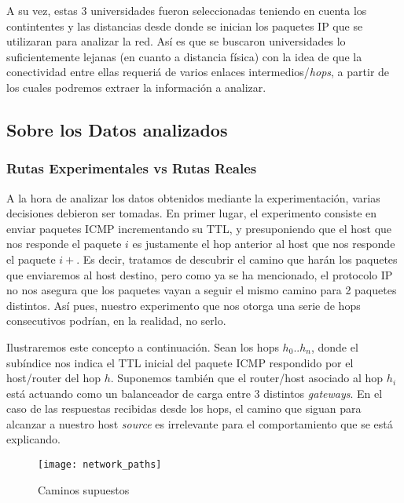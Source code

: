 \par A su vez, estas 3 universidades fueron seleccionadas teniendo en cuenta
los contintentes y las distancias desde donde se inician los paquetes IP que
se utilizaran para analizar la red. As\'i es que se buscaron universidades
lo suficientemente lejanas (en cuanto a distancia f\'isica) con la idea de que
la conectividad entre ellas
requeri\'a de varios enlaces intermedios/\textit{hops}, a partir de los cuales
podremos extraer la informaci\'on a analizar.


\subsection*{Sobre los Datos analizados}\label{sec:datos_analizados}
\subsubsection*{Rutas Experimentales vs Rutas Reales}
\par A la hora de analizar los datos obtenidos mediante la experimentaci\'on,
varias decisiones debieron ser tomadas. En primer lugar, el experimento consiste en
enviar paquetes ICMP incrementando su TTL, y presuponiendo que el host que
nos responde el paquete $i$ es justamente el hop anterior al host que nos
responde el paquete $i+$. Es decir, tratamos de descubrir el camino
que har\'an los paquetes que enviaremos al host destino, pero como ya
se ha mencionado, el protocolo IP no nos asegura que los paquetes vayan
a seguir el mismo camino para 2 paquetes distintos. As\'i pues, nuestro
experimento que nos otorga una serie de hops consecutivos podr\'ian, en la
realidad, no serlo.

\par Ilustraremos este concepto a continuaci\'on. Sean los hops $h_0..h_n$,
donde el sub\'indice nos indica el TTL inicial del paquete ICMP respondido por
el host/router del hop $h$. Suponemos tambi\'en que el router/host asociado al hop
$h_i$ est\'a actuando como un balanceador de carga entre 3 distintos
\textit{gateways}. En el caso de las respuestas recibidas desde los hops, el
camino que siguan para alcanzar a nuestro host \textit{source} es irrelevante
para el comportamiento que se est\'a explicando.

\begin{figure}[h]
    \centering
    \texttt{[image: network\_paths]}
    \caption{Caminos supuestos}
    \label{fig:network_paths}
\end{figure}

